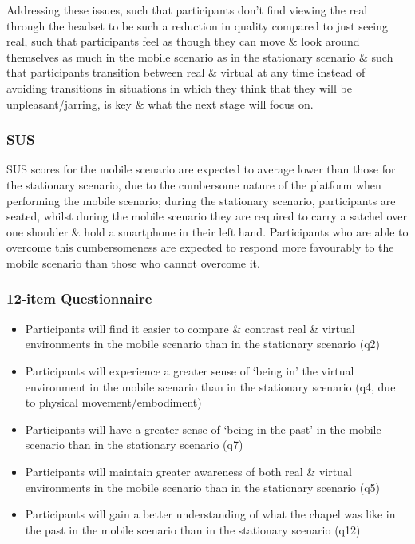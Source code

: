 Addressing these issues, such that participants don't find viewing the real through the headset to be such a reduction in quality compared to just seeing real, such that participants feel as though they can move \& look around themselves as much in the mobile scenario as in the stationary scenario \& such that participants transition between real \& virtual at any time instead of avoiding transitions in situations in which they think that they will be unpleasant/jarring, is key \& what the next stage will focus on.


\subsubsection{SUS}
SUS scores for the mobile scenario are expected to average lower than those for the stationary scenario, due to the cumbersome nature of the platform when performing the mobile scenario; during the stationary scenario, participants are seated, whilst during the mobile scenario they are required to carry a satchel over one shoulder \& hold a smartphone in their left hand. Participants who are able to overcome this cumbersomeness are expected to respond more favourably to the mobile scenario than those who cannot overcome it.

\subsubsection{12-item Questionnaire}
\begin{itemize}
	\item Participants will find it easier to compare \& contrast real \& virtual environments in the mobile scenario than in the stationary scenario (q2)
	\item Participants will experience a greater  sense of `being in' the virtual environment in the mobile scenario than in the stationary scenario (q4, due to physical movement/embodiment)
	\item Participants will have a greater sense of `being in the past' in the mobile scenario than in the stationary scenario (q7)
	\item Participants will maintain greater awareness of both real \& virtual environments in the mobile scenario than in the stationary scenario (q5)
	\item Participants will gain a better understanding of what the chapel was like in the past in the mobile scenario than in the stationary scenario (q12)
\end{itemize}

